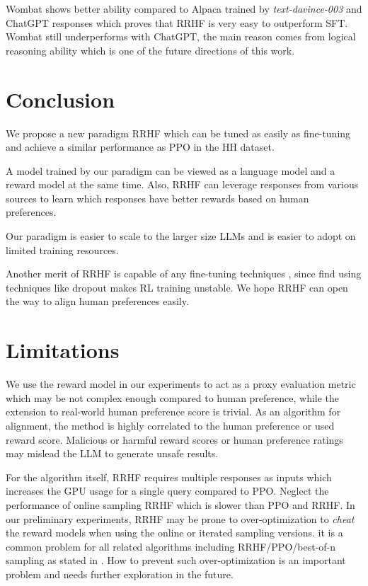 Wombat shows better ability compared to Alpaca trained by \textit{text-davince-003} and ChatGPT responses which proves that RRHF is very easy to outperform SFT. Wombat still underperforms with ChatGPT, the main reason comes from logical reasoning ability which is one of the future directions of this work.

\section{Conclusion}

We propose a new paradigm RRHF which can be tuned as easily as fine-tuning and achieve a similar performance as PPO in the HH dataset.

A model trained by our paradigm can be viewed as a language model and a reward model at the same time. Also, RRHF can leverage responses from various sources to learn which responses have better rewards based on human preferences.

Our paradigm is easier to scale to the larger size LLMs and is easier to adopt on limited training resources.

Another merit of RRHF is capable of any fine-tuning techniques \cite{xu-etal-2021-raise,liang2021rdrop,yuan2022hype}, since \citet{rl4lms} find using techniques like dropout makes RL training unstable. We hope RRHF can open the way to align human preferences easily.

\section*{Limitations}

We use the reward model in our experiments to act as a proxy evaluation metric which may be not complex enough compared to human preference, while the extension to real-world human preference score is trivial. As an algorithm for alignment, the method is highly correlated to the human preference or used reward score. Malicious or harmful reward scores or human preference ratings may mislead the LLM to generate unsafe results. 

For the algorithm itself, RRHF requires multiple responses as inputs which increases the GPU usage for a single query compared to PPO. Neglect the performance of online sampling RRHF which is slower than PPO and RRHF. In our preliminary experiments, RRHF may be prone to over-optimization to \textit{cheat} the reward models when using the online or iterated sampling versions. it is a common problem for all related algorithms including RRHF/PPO/best-of-n sampling as stated in \cite{gao2022scaling}. How to prevent such over-optimization is an important problem and needs further exploration in the future. 


